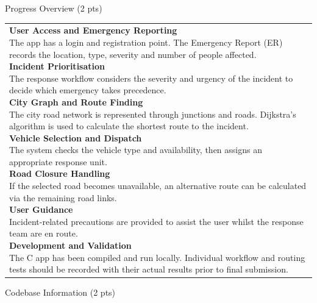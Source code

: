\documentclass[12pt,a4paper]{article}
\newcommand{\sectiontitle}[1]{%
    {\color{GEUBlue}
    \fontsize{18}{22}\selectfont #1}
}
\newcommand{\answerbox}[2]{%
    \noindent
    \begin{tabularx}{\textwidth}{
        |>{\raggedright\arraybackslash}X|}
        \hline
        \parbox[t]{\dimexpr\linewidth-12pt\relax}{%
            \vspace{5pt}
            \fontsize{11}{13}\selectfont #2
            \vspace{5pt}
        }\\
        \hline
    \end{tabularx}
}
\begin{document}
\vspace{0.80cm}

\Needspace{9cm}\sectiontitle{Progress Overview (2 pts)}

\vspace{0.40cm}

\answerbox{8.50cm}{%
\textbf{User Access and Emergency Reporting}\\
The app has a login and registration point. The Emergency Report (ER) records
the location, type, severity and number of people affected.\\[6pt]
\textbf{Incident Prioritisation}\\
The response workflow considers the severity and urgency of the incident to
decide which emergency takes precedence.\\[6pt]
\textbf{City Graph and Route Finding}\\
The city road network is represented through junctions and roads. Dijkstra's
algorithm is used to calculate the shortest route to the incident.\\[6pt]
\textbf{Vehicle Selection and Dispatch}\\
The system checks the vehicle type and availability, then assigns an
appropriate response unit.\\[6pt]
\textbf{Road Closure Handling}\\
If the selected road becomes unavailable, an alternative route can be
calculated via the remaining road links.\\[6pt]
\textbf{User Guidance}\\
Incident-related precautions are provided to assist the user whilst the
response team are en route.\\[6pt]
\textbf{Development and Validation}\\
The C app has been compiled and run locally. Individual workflow and routing
tests should be recorded with their actual results prior to final submission.
}

\newpage


\vspace*{0.20cm}

\sectiontitle{Codebase Information (2 pts)}

\vspace{0.40cm}
\end{document}
